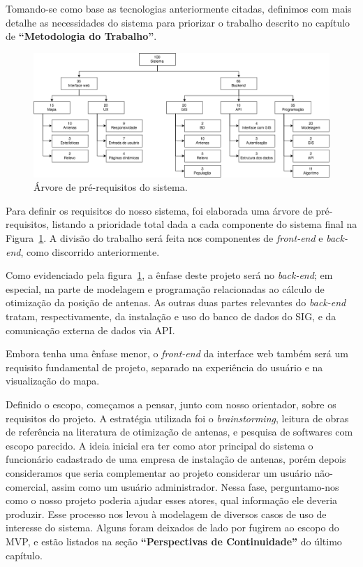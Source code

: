 \documentclass[]{politex}
\begin{document}
Tomando-se como base as tecnologias anteriormente citadas, definimos com mais
detalhe as necessidades do sistema para priorizar o trabalho descrito no
capítulo de \textbf{``Metodologia do Trabalho''}.

\begin{figure}[H]
    \centering
    \includegraphics[width=6in]{imagens/arvore_prerequisitos}
    \caption{Árvore de pré-requisitos do sistema.}
    \label{fig:arvore_prerequisitos}
\end{figure}

Para definir os requisitos do nosso sistema, foi elaborada uma árvore de
pré-requisitos, listando a prioridade total dada a cada componente do sistema
final na Figura~\ref{fig:arvore_prerequisitos}. A divisão do trabalho será
feita nos componentes de \textit{front-end} e \textit{back-end}, como discorrido
anteriormente.

Como evidenciado pela figura~\ref{fig:arvore_prerequisitos}, a ênfase deste projeto será no \textit{back-end};
em especial, na parte de modelagem e programação relacionadas ao cálculo de
otimização da posição de antenas. As outras duas partes relevantes do
\textit{back-end} tratam, respectivamente, da instalação e uso do banco de dados do SIG, e
da comunicação externa de dados via API.

Embora tenha uma ênfase menor, o \textit{front-end} da interface web também será
um requisito fundamental de projeto, separado na experiência do usuário e na
visualização do mapa.

Definido o escopo, começamos a pensar, junto com nosso orientador, sobre os
requisitos do projeto. A estratégia utilizada foi o \textit{brainstorming}, leitura de
obras de referência na literatura de otimização de antenas, e pesquisa de softwares com escopo parecido.
A ideia inicial era ter como ator principal do sistema o funcionário cadastrado
de uma empresa de instalação de antenas, porém depois consideramos que seria
complementar ao projeto considerar um usuário não-comercial, assim
como um usuário administrador. Nessa fase, perguntamo-nos como o nosso projeto
poderia ajudar esses atores, qual informação ele deveria produzir. Esse processo
nos levou à modelagem de diversos casos de uso de interesse do sistema. Alguns
foram deixados de lado por fugirem ao escopo do MVP, e estão listados na seção
\textbf{``Perspectivas de Continuidade''} do último capítulo.
\end{document}
